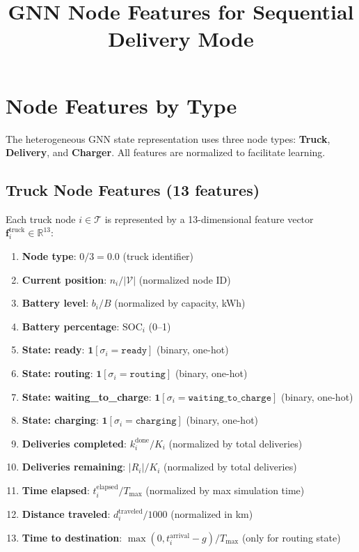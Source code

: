 \documentclass[11pt]{article}
\title{GNN Node Features for Sequential Delivery Mode}
\author{}
\date{}
\begin{document}
\maketitle

\section{Node Features by Type}

The heterogeneous GNN state representation uses three node types: \textbf{Truck}, \textbf{Delivery}, and \textbf{Charger}. All features are normalized to facilitate learning.

\subsection{Truck Node Features (13 features)}

Each truck node $i \in \mathcal{T}$ is represented by a 13-dimensional feature vector $\mathbf{f}_i^{\text{truck}} \in \mathbb{R}^{13}$:

\begin{enumerate}[nosep]
    \item \textbf{Node type}: $0 / 3 = 0.0$ (truck identifier)
    \item \textbf{Current position}: $n_i / |\mathcal{V}|$ (normalized node ID)
    \item \textbf{Battery level}: $b_i / B$ (normalized by capacity, kWh)
    \item \textbf{Battery percentage}: $\text{SOC}_i$ (0--1)
    \item \textbf{State: ready}: $\mathbf{1}[\sigma_i = \texttt{ready}]$ (binary, one-hot)
    \item \textbf{State: routing}: $\mathbf{1}[\sigma_i = \texttt{routing}]$ (binary, one-hot)
    \item \textbf{State: waiting\_to\_charge}: $\mathbf{1}[\sigma_i = \texttt{waiting\_to\_charge}]$ (binary, one-hot)
    \item \textbf{State: charging}: $\mathbf{1}[\sigma_i = \texttt{charging}]$ (binary, one-hot)
    \item \textbf{Deliveries completed}: $k_i^{\text{done}} / K_i$ (normalized by total deliveries)
    \item \textbf{Deliveries remaining}: $|R_i| / K_i$ (normalized by total deliveries)
    \item \textbf{Time elapsed}: $t_i^{\text{elapsed}} / T_{\max}$ (normalized by max simulation time)
    \item \textbf{Distance traveled}: $d_i^{\text{traveled}} / 1000$ (normalized in km)
    \item \textbf{Time to destination}: $\max(0, t_i^{\text{arrival}} - g) / T_{\max}$ (only for routing state)
\end{enumerate}
\end{document}
